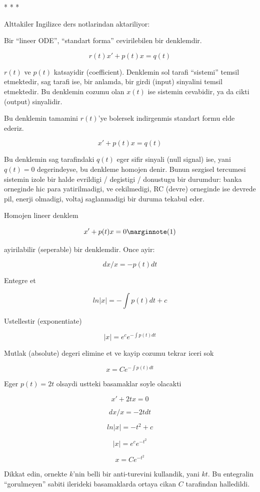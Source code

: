 \documentclass[12pt,fleqn]{article}\usepackage{../common}
\begin{document}
* * *

Alttakiler Ingilizce ders notlarindan aktariliyor:

Bir ``lineer ODE'', ``standart forma'' cevirilebilen bir denklemdir.

\[ r(t)x' + p(t)x = q(t) \]

$r(t)$ ve $p(t)$ katsayidir (coefficient). Denklemin sol tarafi ``sistemi''
temsil etmektedir, sag tarafi ise, bir anlamda, bir girdi (input) sinyalini
temsil etmektedir. Bu denklemin cozumu olan $x(t)$ ise sistemin cevabidir,
ya da cikti (output) sinyalidir. 

Bu denklemin tamamini $r(t)$'ye bolersek indirgenmis standart formu elde
ederiz. 

\[ x' + p(t)x = q(t) \]

Bu denklemin sag tarafindaki $q(t)$ eger sifir sinyali (null signal) ise,
yani $q(t) = 0$ degerindeyse, bu denkleme homojen denir. Bunun sezgisel
tercumesi sistemin izole bir halde evrildigi / degistigi / donustugu bir
durumdur: banka orneginde hic para yatirilmadigi, ve cekilmedigi, RC
(devre) orneginde ise devrede pil, enerji olmadigi, voltaj saglanmadigi bir
duruma tekabul eder. 

Homojen lineer denklem

\[
x' + p(t) x = 0 
\mlabel{1}
\]

ayirilabilir (seperable) bir denklemdir. Once ayir:

\[ dx/x = - p(t) dt \]

Entegre et

\[ ln|x| = - \int p(t) dt + c \]

Ustellestir (exponentiate)

\[ |x| = e^c e^{ - \int p(t) dt } \]

Mutlak (absolute) degeri elimine et ve kayip cozumu tekrar iceri sok

\[ x = C e^{- \int p(t) dt} \]

Eger $p(t) = 2t$ olsaydi ustteki basamaklar soyle olacakti

\[ x' + 2tx = 0 \]

\[ dx/x = - 2t dt \]

\[ ln|x| = - t^2 + c \]

\[ |x| = e^c e^{-t^2} \]

\[ x = C e^{-t^2} \]

Dikkat edin, ornekte $k$'nin belli bir anti-turevini kullandik, yani
$kt$. Bu entegralin ``gorulmeyen'' sabiti ilerideki basamaklarda ortaya
cikan $C$ tarafindan halledildi. 
\end{document}
